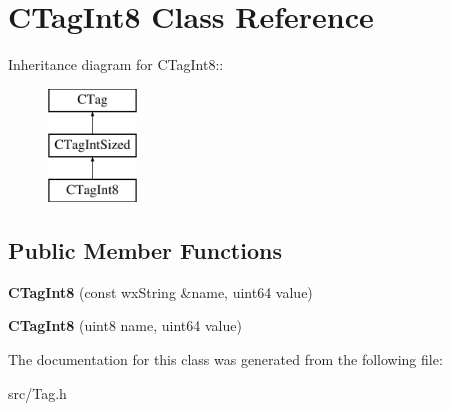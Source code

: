 \section{CTagInt8 Class Reference}
\label{classCTagInt8}
Inheritance diagram for CTagInt8::\begin{figure}[H]
\begin{center}
\leavevmode
\includegraphics[height=3cm]{classCTagInt8}
\end{center}
\end{figure}
\subsection*{Public Member Functions}
\begin{DoxyCompactItemize}
\item 
{\bfseries CTagInt8} (const wxString \&name, uint64 value)\label{classCTagInt8_af98003731dc78b840c4603082a7aa210}

\item 
{\bfseries CTagInt8} (uint8 name, uint64 value)\label{classCTagInt8_af97d6651c1b0d7b045d4f179614ecd47}

\end{DoxyCompactItemize}


The documentation for this class was generated from the following file:\begin{DoxyCompactItemize}
\item 
src/Tag.h\end{DoxyCompactItemize}

